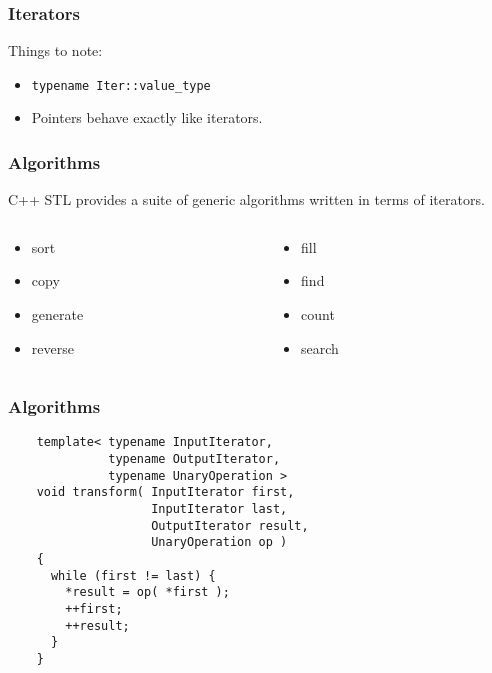 \begin{frame}[fragile]
  \frametitle{Iterators}
  Things to note:
  \begin{itemize}
    \item \lstinline|typename Iter::value_type|
    \item Pointers behave exactly like iterators.
  \end{itemize}
\end{frame}

\begin{frame}
  \frametitle{Algorithms}
  C++ STL provides a suite of generic algorithms written in
  terms of iterators.
  \begin{columns}
    \begin{column}{.5\textwidth}
      \begin{itemize}
      \item sort
      \item copy
      \item generate
      \item reverse
      \end{itemize}
    \end{column}
    \begin{column}{.5\textwidth}
      \begin{itemize}
      \item fill
      \item find
      \item count
      \item search
      \end{itemize}
    \end{column}
  \end{columns}
\end{frame}

\begin{frame}[fragile]
  \frametitle{Algorithms}
  \begin{example}
    \begin{lstlisting}
    template< typename InputIterator,
              typename OutputIterator,
              typename UnaryOperation >
    void transform( InputIterator first,
                    InputIterator last,
                    OutputIterator result,
                    UnaryOperation op )
    {
      while (first != last) {
        *result = op( *first );
        ++first;
        ++result;
      }
    }
    \end{lstlisting}
  \end{example}
\end{frame}

